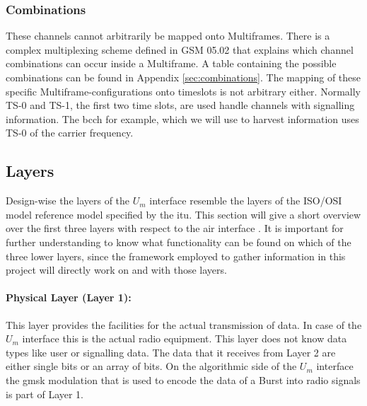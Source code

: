 \subsubsection{Combinations}
These channels cannot arbitrarily be mapped onto Multiframes.
There is a complex multiplexing scheme defined in GSM 05.02 \cite{gsm0502} that explains which channel combinations can occur inside a Multiframe.
A table containing the possible combinations can be found in Appendix \ref{sec:combinations}.
The mapping of these specific Multiframe-configurations onto timeslots is not arbitrary either.
Normally TS-0 and TS-1, the first two time slots, are used handle channels with signalling information.
The \gls{bcch} for example, which we will use to harvest information uses TS-0 of the carrier frequency.

\subsection{Layers}
\label{sec:layers}
Design-wise the layers of the $U_m$ interface resemble the layers of the ISO/OSI model reference model specified by the \gls{itu}.
This section will give a short overview over the first three layers with respect to the air interface \cite{protocols1999}.
It is important for further understanding to know what functionality can be found on which of the three lower layers, since the framework employed to gather information in this project will directly work on and with those layers.

\paragraph{Physical Layer (Layer 1):} This layer provides the facilities for the actual transmission of data.
In case of the $U_m$ interface this is the actual radio equipment.
This layer does not know data types like user or signalling data.
The data that it receives from Layer 2 are either single bits or an array of bits.
On the algorithmic side of the $U_m$ interface the \gls{gmsk} modulation that is used to encode the data of a Burst into radio signals is part of Layer 1.

